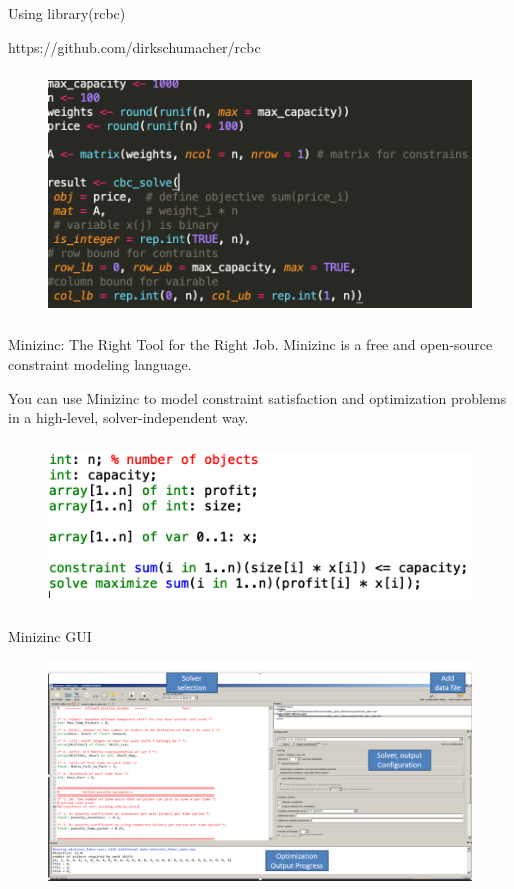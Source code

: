 \documentclass[xcolor=dvipsnames,aspectratio=169]{beamer}
\begin{document}
\begin{frame}{Using library(rcbc)}


https://github.com/dirkschumacher/rcbc

\begin{figure}[t]
  \includegraphics[height =6.5cm]{knapsack.png}

\centering
\end{figure}
\end{frame}



\begin{frame}{Minizinc: The Right Tool for the Right Job.}
Minizinc is a free and open-source constraint modeling language.

You can use Minizinc to model constraint 
satisfaction and optimization problems in a 
high-level, solver-independent way.

    \begin{figure}
    \centering
        \includegraphics[height =4.4cm]{Minizinc_knapsack.png}
    \end{figure}
\end{frame}

\begin{frame}{Minizinc GUI}
\begin{figure}
    \centering
    \includegraphics[scale=0.5]{minizinc_gui.PNG}
    \end{figure}


\end{frame}
\end{document}

